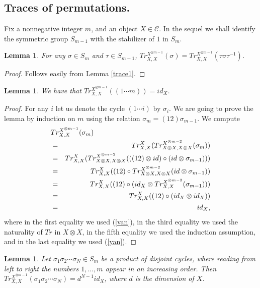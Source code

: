 \documentclass{amsart}
\newtheorem{lemma}[theorem]{Lemma}
\theoremstyle{definition}
\newcommand{\ot}{\otimes}
\newcommand{\C}{{\mathcal C}}
\begin{document}
\subsection{Traces of permutations.}
Fix a nonnegative integer $m$, and an object $X\in \C$. In the
sequel we shall identify the symmetric group $S_{m-1}$ with the
stabilizer of $1$ in $S_{m}$.

\begin{lemma}\label{l1}
For any $\sigma\in S_{m}$ and $\tau\in S_{m-1}$, $Tr_{X,X}^{X^{\ot
m-1 }}(\sigma)=Tr_{X,X}^{X^{\ot m-1 }}(\tau\sigma\tau^{-1})$.
\end{lemma}

\begin{proof}
Follows easily from Lemma \ref{trace1}.
\end{proof}

\begin{lemma}\label{l3}
We have that $Tr_{X,X}^{X^{\ot m-1 }}((1\cdots m))=id_X$.
\end{lemma}

\begin{proof}
For any $i$ let us denote the cycle $(1\cdots i)$ by $\sigma_i$. We
are going to prove the lemma by induction on $m$ using the relation
$\sigma_{m}=(12)\sigma_{m-1}$. We compute
\begin{eqnarray*}
\lefteqn { Tr_{X,X}^{X^{\ot m-1}}(\sigma_{m})
}\\
& = & Tr_{X,X}^{X}(Tr_{X\ot X,X\ot X}^{X^{\ot m -2}}(\sigma_{m}))\\
& = & Tr_{X,X}^{X}(Tr_{X\ot X,X\ot X}^{X^{\ot m -2}}(((12)\ot id)
\circ(id\ot \sigma_{m-1})))\\
& = & Tr_{X,X}^{X}((12)\circ Tr_{X\ot X,X\ot X}^{X^{\ot m -2}}(id\ot
\sigma_{m-1}))\\
& = & Tr_{X,X}^{X}((12)\circ (id_X\ot Tr_{X,X}^{X^{\ot m -2}}
(\sigma_{m-1})))\\
& = & Tr_{X,X}^{X}((12)\circ (id_X\ot id_X))\\
& = & id_X,
\end{eqnarray*}
where in the first equality we used (\ref{van}), in the third
equality we used the naturality of $Tr$ in $X\ot X$, in the fifth
equality we used the induction assumption, and in the last equality
we used (\ref{yan}).
\end{proof}

\begin{lemma}\label{l2}
Let $\sigma_1\sigma_2\cdots\sigma_{N}\in S_{m}$ be a product of
disjoint cycles, where reading from left to right the numbers
$1,\dots,m$ appear in an increasing order. Then $Tr_{X,X}^{X^{\ot
m-1}}(\sigma_1\sigma_2\cdots\sigma_{N})=d^{N-1}id_X$, where $d$ is
the dimension of $X$.
\end{lemma}
\end{document}
